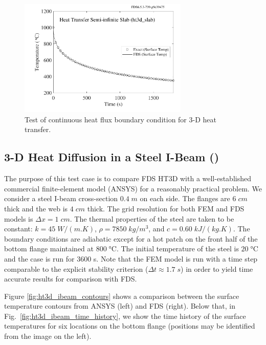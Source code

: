 \documentclass[11pt]{book}
\begin{document}
\begin{figure}[ht]
\centering
\includegraphics[height=2.2in]{SCRIPT_FIGURES/ht3d_slab}
\caption[The  test cases]{Test of continuous heat flux boundary condition for 3-D heat transfer.}
\label{fig:ht3d_slab}
\end{figure}

\FloatBarrier

\subsection{3-D Heat Diffusion in a Steel I-Beam (\texorpdfstring{}{ht3d\_ibeam})}
\label{ht3d_ibeam}

The purpose of this test case is to compare FDS HT3D with a well-established commercial finite-element model (ANSYS) for a reasonably practical problem.  We consider a steel I-beam cross-section $0.4 \;\si{m}$ on each side.  The flanges are $6 \;\si{cm}$ thick and the web is $4 \;\si{cm}$ thick.  The grid resolution for both FEM and FDS models is $\Delta x = 1 \;\si{cm}$.  The thermal properties of the steel are taken to be constant: $k=45 \;\si{W/(m.K)}$, $\rho=7850 \;\si{kg/m^3}$, and $c = 0.60 \;\si{kJ/(kg.K)}$.  The boundary conditions are adiabatic except for a hot patch on the front half of the bottom flange maintained at $800 \;\si{\degreeCelsius}$.  The initial temperature of the steel is $20 \;\si{\degreeCelsius}$ and the case is run for 3600 s.  Note that the FEM model is run with a time step comparable to the explicit stability criterion ($\Delta t \approx 1.7 \;\si{s}$) in order to yield time accurate results for comparison with FDS.

Figure \ref{fig:ht3d_ibeam_contours} shows a comparison between the surface temperature contours from ANSYS (left) and FDS (right).  Below that, in Fig.~\ref{fig:ht3d_ibeam_time_history}, we show the time history of the surface temperatures for six locations on the bottom flange (positions may be identified from the image on the left).
\end{document}
